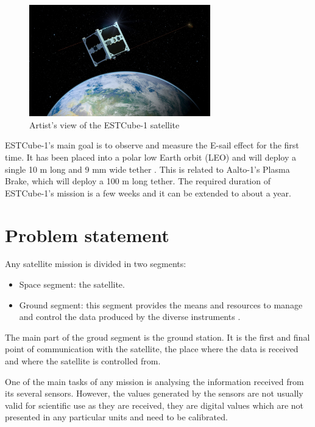 \begin{figure}[H]
\centerline{\includegraphics[width=0.7\textwidth]{images/ESTCube.jpg}}
\caption{Artist's view of the ESTCube-1 satellite}
\label{f1.5}
\end{figure}

ESTCube-1's main goal is to observe and measure the E-sail \cite{ESail} effect for the first time. It has been placed into a polar low Earth orbit (LEO) and will deploy a single 10 m long and 9 mm wide tether \cite{ESTCube}. This is related to Aalto-1's Plasma Brake, which will deploy a 100 m long tether. The required duration of ESTCube-1's mission is a few weeks and it can be extended to about a year.


\section{Problem statement}\label{1.2}

Any satellite mission is divided in two segments:
\begin{itemize}

	\item Space segment: the satellite.
	\item Ground segment: this segment provides the means and resources to manage and control the data produced by the diverse instruments \cite{ESA}. 

\end{itemize}

The main part of the groud segment is the ground station. It is the first and final point of communication with the satellite, the place where the data is received and where the satellite is controlled from.


One of the main tasks of any mission is analysing the information received from its several sensors. However, the values generated by the sensors are not usually valid for scientific use as they are received, they are digital values which are not presented in any particular units and need to be calibrated.\\

